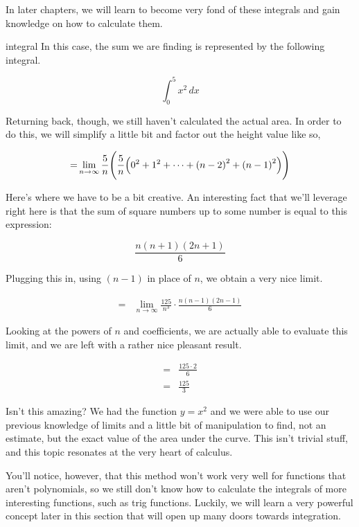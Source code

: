 In later chapters, we will learn to become very fond of these integrals and gain knowledge on how to calculate them.

\begin{example}{integral}
    In this case, the sum we are finding is represented by the following integral.

    \[
        \int_{ 0 }^{ 5 } x^2 \, dx
    \]
\end{example}

Returning back, though, we still haven't calculated the actual area. In order to do this, we will simplify a little bit and factor out the height value like so,

\begin{align*}
    = &\lim_{n \to \infty} \frac{5}{n} \Biggl( \frac{5}{n} \Bigl( 0^2 + 1^2 + \cdots + \left( n - 2 \right)^2 + \left( n - 1 \right)^2 \Bigr) \Biggr) \\
\end{align*}

Here's where we have to be a bit creative. An interesting fact that we'll leverage right here is that the sum of square numbers up to some number is equal to this expression:

\[
    \frac{n \left( n + 1 \right) \left( 2n + 1 \right)}{6}
\]

Plugging this in, using \( \left( n - 1 \right) \) in place of \( n \), we obtain a very nice limit.

\begin{align*}
    = & \lim_{n \to \infty} \frac{125}{n^3} \cdot \frac{n \left( n - 1 \right) \left( 2n - 1 \right)}{6}
\end{align*}

Looking at the powers of \( n \) and coefficients, we are actually able to evaluate this limit, and we are left with a rather nice pleasant result.

\begin{align*}
    = &\frac{125 \cdot 2}{6} \\
    = &\frac{125}{3}
\end{align*}

Isn't this amazing? We had the function \( y = x^2 \) and we were able to use our previous knowledge of limits and a little bit of manipulation to find, not an estimate, but the exact value of the area under the curve. This isn't trivial stuff, and this topic resonates at the very heart of calculus.

You'll notice, however, that this method won't work very well for functions that aren't polynomials, so we still don't know how to calculate the integrals of more interesting functions, such as trig functions. Luckily, we will learn a very powerful concept later in this section that will open up many doors towards integration.

